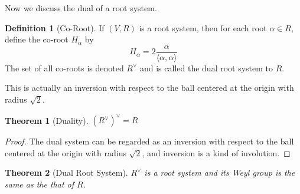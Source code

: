 \documentclass{article}
\newtheorem{theorem}{Theorem}[section]
\theoremstyle{definition}
\newtheorem{definition}{Definition}[section]
\begin{document}
Now we discuss the dual of a root system.
\begin{definition}[Co-Root]
    If $(V,R)$ is a root system, then for each root $\alpha\in R$, define the co-root $H_\alpha$ by \[H_\alpha=2\frac{\alpha}{\langle\alpha,\alpha\rangle}\] 
    The set of all co-roots is denoted $R^\vee$ and is called the dual root system to $R$.
\end{definition}
This is actually an inversion with respect to the ball centered at the origin with radius $\sqrt{2}$. 
\begin{theorem}[Duality]
    $(R^\vee)^\vee=R$
\end{theorem}
\begin{proof}
    The dual system can be regarded as an inversion with respect to the ball centered at the origin with radius $\sqrt{2}$,
    and inversion is a kind of involution.
\end{proof}
\begin{theorem}[Dual Root System]
    $R^\vee$ is a root system and its Weyl group is the same as the that of $R$. 
\end{theorem}
\end{document}
